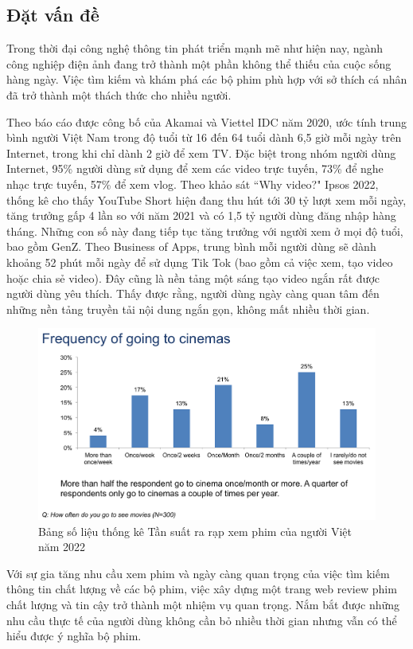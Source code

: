 \documentclass[12pt]{article}
\begin{document}
\subsection{ Đặt vấn đề}
Trong thời đại công nghệ thông tin phát triển mạnh mẽ như hiện nay, ngành công nghiệp điện ảnh đang trở thành một phần không thể thiếu của cuộc sống hàng ngày. Việc tìm kiếm và khám phá các bộ phim phù hợp với sở thích cá nhân đã trở thành một thách thức cho nhiều người.

Theo báo cáo được công bố của Akamai và Viettel IDC năm 2020, ước tính trung bình người Việt Nam trong độ tuổi từ 16 đến 64 tuổi dành 6,5 giờ mỗi ngày trên Internet, trong khi chỉ dành 2 giờ để xem TV. Đặc biệt trong nhóm người dùng Internet, 95\% người dùng sử dụng để xem các video trực tuyến, 73\% để nghe nhạc trực tuyến, 57\% để xem vlog. 
Theo khảo sát “Why video?" Ipsos 2022, thống kê cho thấy YouTube Short hiện đang thu hút tới 30 tỷ lượt xem mỗi ngày, tăng trưởng gấp 4 lần so với năm 2021 và có 1,5 tỷ người dùng đăng nhập hàng tháng. Những con số này đang tiếp tục tăng trưởng với người xem ở mọi độ tuổi, bao gồm GenZ. Theo Business of Apps, trung bình mỗi người dùng sẽ dành khoảng 52 phút mỗi ngày để sử dụng Tik Tok (bao gồm cả việc xem, tạo video hoặc chia sẻ video). Đây cũng là nền tảng một sáng tạo video ngắn rất được người dùng yêu thích. Thấy được rằng, người dùng ngày càng quan tâm đến những nền tảng truyền tải nội dung ngắn gọn, không mất nhiều thời gian.
\begin{figure}[H]
    \centering
    \includegraphics[scale=0.7]{Figs/Static.png}
    \caption{Bảng số liệu thống kê Tần suất ra rạp xem phim của người Việt năm 2022}
\end{figure}
Với sự gia tăng nhu cầu xem phim và ngày càng quan trọng của việc tìm kiếm thông tin chất lượng về các bộ phim, việc xây dựng một trang web review phim chất lượng và tin cậy trở thành một nhiệm vụ quan trọng. Nắm bắt được những nhu cầu thực tế của người dùng không cần bỏ nhiều thời gian nhưng vẫn có thể hiểu được ý nghĩa bộ phim. 
\end{document}
